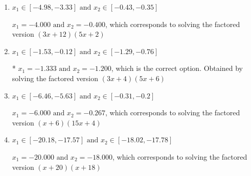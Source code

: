 \documentclass{extbook}[14pt]
\begin{document}
\begin{enumerate}
{\begin{enumerate}[label=\Alph*.]
$x_1 = -2.400 \text{ and } x_2 = -0.667$, which corresponds to solving the factored version $(5x + 12)(3x + 2)$
\item \( x_1 \in [-4.98, -3.33] \text{ and } x_2 \in [-0.43, -0.35] \)

$x_1 = -4.000 \text{ and } x_2 = -0.400$, which corresponds to solving the factored version $(3x + 12)(5x + 2)$
\item \( x_1 \in [-1.53, -0.12] \text{ and } x_2 \in [-1.29, -0.76] \)

* $x_1 = -1.333 \text{ and } x_2 = -1.200$, which is the correct option. Obtained by solving the factored version $(3x + 4)(5x + 6)$
\item \( x_1 \in [-6.46, -5.63] \text{ and } x_2 \in [-0.31, -0.2] \)

$x_1 = -6.000 \text{ and } x_2 = -0.267$, which corresponds to solving the factored version $(x + 6)(15x + 4)$
\item \( x_1 \in [-20.18, -17.57] \text{ and } x_2 \in [-18.02, -17.78] \)

$x_1 = -20.000 \text{ and } x_2 = -18.000$, which corresponds to solving the factored version $(x + 20)(x + 18)$
\end{enumerate}

}
\end{enumerate}
\end{document}
